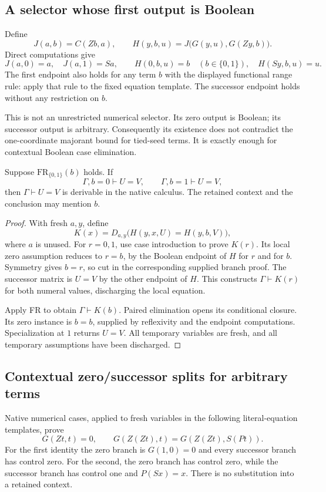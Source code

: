 \subsection{A selector whose first output is Boolean}
Define
\[
 J(a,b)=C(Zb,a),\qquad
 H(y,b,u)=J\bigl(G(y,u),G(Zy,b)\bigr).
 \tag{H}\label{monus:H}
\]
Direct computations give
\[
 J(a,0)=a,\quad J(a,1)=Sa,\qquad
 H(0,b,u)=b\quad(b\in\{0,1\}),\quad H(Sy,b,u)=u.
 \tag{H endpoints}\label{monus:H-endpoints}
\]
The first endpoint also holds for any term $b$ with the displayed
functional range rule: apply that rule to the fixed equation template.
The successor endpoint holds without any restriction on $b$.

This is not an unrestricted numerical selector. Its zero output is
Boolean; its successor output is arbitrary. Consequently its existence
does not contradict the one-coordinate majorant bound for tied-seed
terms. It is exactly enough for contextual Boolean case elimination.

\begin{lemma}
\label{monus:contextual-Boolean}
Suppose $\mathrm{FR}_{\{0,1\}}(b)$ holds. If
\[
 \Gamma,b=0\vdash U=V,\qquad
 \Gamma,b=1\vdash U=V,
\]
then $\Gamma\vdash U=V$ is derivable in the native calculus. The retained
context and the conclusion may mention $b$.
\end{lemma}
\begin{proof}
With fresh $a,y$, define
\[
 K(x)=D_{a,y}\bigl(H(y,x,U)=H(y,b,V)\bigr),
\]
where $a$ is unused. For $r=0,1$, use case introduction to prove $K(r)$.
Its local zero assumption reduces to $r=b$, by the Boolean endpoint
of $H$ for $r$ and for $b$. Symmetry gives $b=r$, so cut in the
corresponding supplied branch proof. The successor matrix is $U=V$
by the other endpoint of $H$. This constructs $\Gamma\vdash K(r)$
for both numeral values, discharging the local equation.

Apply FR to obtain $\Gamma\vdash K(b)$. Paired elimination opens its
conditional closure. Its zero instance is $b=b$, supplied by
reflexivity and the endpoint computations. Specialization at $1$
returns $U=V$. All temporary variables are fresh, and all temporary
assumptions have been discharged.
\end{proof}

\subsection{Contextual zero/successor splits for arbitrary terms}
Native numerical cases, applied to fresh variables in the following
literal-equation templates, prove
\[
 G(Zt,t)=0,
 \qquad
 G(Z(Zt),t)=G(Z(Zt),S(Pt)).
 \tag{Reconstruction}\label{monus:native-reconstruction}
\]
For the first identity the zero branch is $G(1,0)=0$ and every
successor branch has control zero. For the second, the zero branch
has control zero, while the successor branch has control one and
$P(Sx)=x$. There is no substitution into a retained context.

